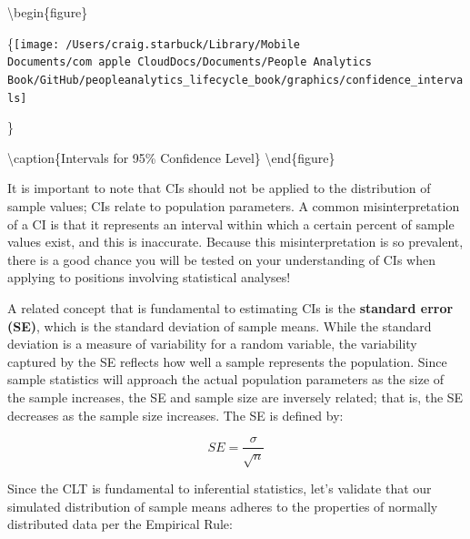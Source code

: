 \documentclass[]{book}
\newenvironment{Shaded}{\begin{snugshade}}{\end{snugshade}}
\newcommand{\CommentTok}[1]{\textcolor[rgb]{0.56,0.35,0.01}{\textit{#1}}}
\newcommand{\DecValTok}[1]{\textcolor[rgb]{0.00,0.00,0.81}{#1}}
\newcommand{\KeywordTok}[1]{\textcolor[rgb]{0.13,0.29,0.53}{\textbf{#1}}}
\newcommand{\NormalTok}[1]{#1}
\newcommand{\OperatorTok}[1]{\textcolor[rgb]{0.81,0.36,0.00}{\textbf{#1}}}
\newcommand{\StringTok}[1]{\textcolor[rgb]{0.31,0.60,0.02}{#1}}
\begin{document}
\textbackslash{}begin\{figure\}

\{\centering \texttt{[image: /Users/craig.starbuck/Library/Mobile Documents/com~apple~CloudDocs/Documents/People Analytics Book/GitHub/peopleanalytics\_lifecycle\_book/graphics/confidence\_intervals]}

\}

\textbackslash{}caption\{Intervals for 95\% Confidence Level\}\label{fig:cis}
\textbackslash{}end\{figure\}

It is important to note that CIs should not be applied to the distribution of sample values; CIs relate to population parameters. A common misinterpretation of a CI is that it represents an interval within which a certain percent of sample values exist, and this is inaccurate. Because this misinterpretation is so prevalent, there is a good chance you will be tested on your understanding of CIs when applying to positions involving statistical analyses!

A related concept that is fundamental to estimating CIs is the \textbf{standard error (SE)}, which is the standard deviation of sample means. While the standard deviation is a measure of variability for a random variable, the variability captured by the SE reflects how well a sample represents the population. Since sample statistics will approach the actual population parameters as the size of the sample increases, the SE and sample size are inversely related; that is, the SE decreases as the sample size increases. The SE is defined by:

\[ SE = \frac{\sigma}{\sqrt{n}} \]

Since the CLT is fundamental to inferential statistics, let's validate that our simulated distribution of sample means adheres to the properties of normally distributed data per the Empirical Rule:

\begin{Shaded}
\end{Shaded}
\end{document}
